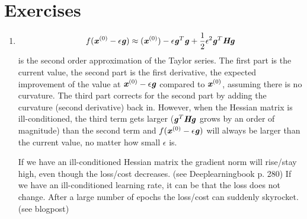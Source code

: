 \def\pathToRoot{.}


\def\issolution{}




\section*{Exercises}

\newcommand{\TODO}[1]{\textcolor{red}{TODO:#1}}

\begin{exercise}

\begin{enumerate}
    \item 
    \begin{equation}
        f(\textbf{\textit{x}}^{(0)} - \epsilon\textbf{\textit{g}}) \approx (\textbf{\textit{x}}^{(0)}) - \epsilon\textbf{\textit{g}}^T\textbf{\textit{g}} + \frac{1}{2} \epsilon^2\textbf{\textit{g}}^T\textbf{\textit{Hg}}
    \end{equation}
    is the second order approximation of the Taylor series. The first part is the current value, the second part is the first derivative, the expected improvement of the value at $ \textbf{\textit{x}}^{(0)} - \epsilon\textbf{\textit{g}}$ compared to $\textbf{\textit{x}}^{(0)}$, assuming there is no curvature. The third part corrects for the second part by adding the curvature (second derivative) back in. However, when the Hessian matrix is ill-conditioned, the third term gets larger ($\textbf{\textit{g}}^T\textbf{\textit{Hg}}$ grows by an order of magnitude) than the second term and $f(\textbf{\textit{x}}^{(0)} - \epsilon\textbf{\textit{g}})$ will always be larger than the current value, no matter how small $\epsilon$ is.
    
    If we have an ill-conditioned Hessian matrix the gradient norm will rise/stay high, even though the loss/cost decreases. (see Deeplearningbook p. 280) If we have an ill-conditioned learning rate, it can be that the loss does not change. After a large number of epochs the loss/cost can suddenly skyrocket. (see blogpost)
    

\end{enumerate}
\end{exercise}
